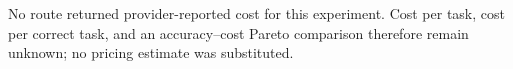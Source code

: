 No route returned provider-reported cost for this experiment. Cost per task, cost per correct task, and an accuracy--cost Pareto comparison therefore remain unknown; no pricing estimate was substituted.
